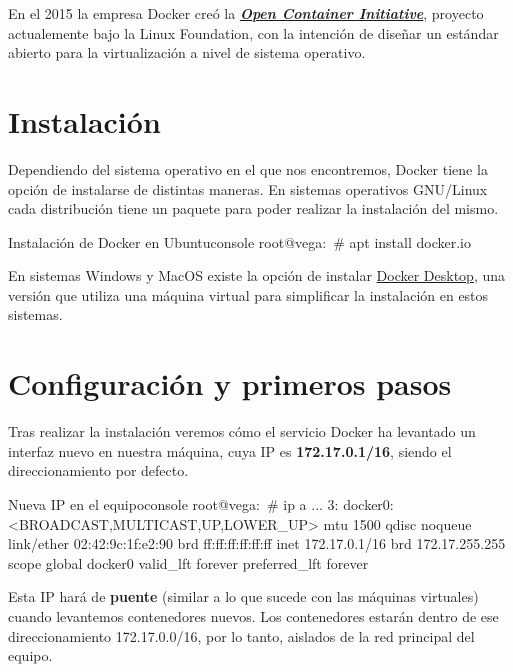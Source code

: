 En el 2015 la empresa Docker creó la \textbf{\textit{\href{https://en.wikipedia.org/wiki/Open_Container_Initiative}{Open Container Initiative}}}, proyecto actualemente bajo la Linux Foundation, con la intención de diseñar un estándar abierto para la virtualización a nivel de sistema operativo.

\section{Instalación}

Dependiendo del sistema operativo en el que nos encontremos, Docker tiene la opción de instalarse de distintas maneras. En sistemas operativos GNU/Linux cada distribución tiene un paquete para poder realizar la instalación del mismo.

\begin{mycode}{Instalación de Docker en Ubuntu}{console}{}
root@vega:~# apt install docker.io
\end{mycode}


En sistemas Windows y MacOS existe la opción de instalar \href{https://docs.docker.com/get-docker/}{Docker Desktop}, una versión que utiliza una máquina virtual para simplificar la instalación en estos sistemas.

\section{Configuración y primeros pasos}

Tras realizar la instalación veremos cómo el servicio Docker ha levantado un interfaz nuevo en nuestra máquina, cuya IP es \textbf{172.17.0.1/16}, siendo el direccionamiento por defecto.

\begin{mycode}{Nueva IP en el equipo}{console}{}
root@vega:~# ip a
...
3: docker0: <BROADCAST,MULTICAST,UP,LOWER_UP> mtu 1500 qdisc noqueue
    link/ether 02:42:9c:1f:e2:90 brd ff:ff:ff:ff:ff:ff
    inet 172.17.0.1/16 brd 172.17.255.255 scope global docker0
      valid_lft forever preferred_lft forever
\end{mycode}

Esta IP hará de \textbf{puente} (similar a lo que sucede con las máquinas virtuales) cuando levantemos contenedores nuevos. Los contenedores estarán dentro de ese direccionamiento 172.17.0.0/16, por lo tanto, aislados de la red principal del equipo.

